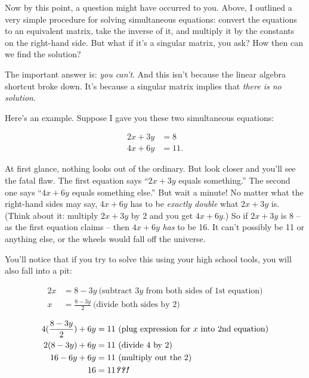 Now by this point, a question might have occurred to you. Above, I outlined a
very simple procedure for solving simultaneous equations: convert the equations
to an equivalent matrix, take the inverse of it, and multiply it by the
constants on the right-hand side. But what if it's a singular matrix, you ask?
How then can we find the solution?

The important answer is: \textit{you can't}. And this isn't because the linear
algebra shortcut broke down. It's because a singular matrix implies that
\textit{there is no solution}.

Here's an example. Suppose I gave you these two simultaneous equations:

\vspace{-.25in}
\begin{align*}
2x + 3y &= 8 \\
4x + 6y &= 11.
\end{align*}
\vspace{-.25in}

At first glance, nothing looks out of the ordinary. But look closer and you'll
see the fatal flaw. The first equation says ``$2x+3y$ equals something.'' The
second one says ``$4x+6y$ equals something else.'' But wait a minute! No matter
what the right-hand sides may say, $4x+6y$ has to be \textit{exactly double}
what $2x+3y$ is. (Think about it: multiply $2x+3y$ by 2 and you get $4x+6y$.)
So if $2x+3y$ is 8 -- as the first equation claims -- then $4x+6y$ \textit{has}
to be 16. It can't possibly be 11 or anything else, or the wheels would fall
off the universe.

You'll notice that if you try to solve this using your high school tools, you
will also fall into a pit:

\vspace{-.25in}
\begin{align*}
2x &= 8 - 3y \ \text{(subtract $3y$ from both sides of 1st equation)} \\
x &= \frac{8 - 3y}{2} \ \text{(divide both sides by 2)} \\
\end{align*}
\vspace{-.55in}
\begin{align*}
4(\frac{8-3y}{2}) + 6y &= 11 \ \text{(plug expression for $x$ into 2nd equation)} \\
2(8-3y) + 6y &= 11 \ \text{(divide 4 by 2)} \\
16 - 6y + 6y &= 11 \ \text{(multiply out the 2)} \\
16 &= 11 \textit{\textbf{??!}}
\end{align*}
\vspace{-.25in}

